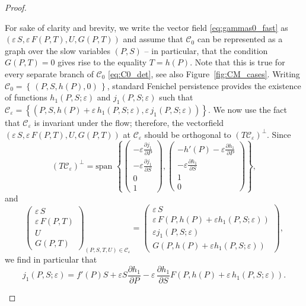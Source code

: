 \documentclass[a4paper,10pt,abstract=true,parskip=true]{scrartcl}
\theoremstyle{remark}
\numberwithin{equation}{section}
\numberwithin{thm}{section}
\newcommand{\eps}{\varepsilon}
\begin{document}
\begin{proof}
\begin{enumerate}
    For sake of clarity and brevity, we write the vector field \eqref{eq:gammas0_fast} as $(\eps\,S,\eps\,F(P,T),U,G(P,T))$ and assume that $\mathcal{C}_0$ can be represented as a graph over the slow variables $(P,S)$ -- in particular, that the condition $G(P,T) = 0$ gives rise to the equality $T = h(P)$. Note that this is true for every separate branch of $\mathcal{C}_0$ \eqref{eq:C0_det}, see also Figure~\ref{fig:CM_cases}. Writing $\mathcal{C}_0 = \left\{\,(P,S,h(P),0)\,\right\}$, standard Fenichel persistence provides the existence of functions $h_1(P,S;\eps)$ and $j_1(P,S;\eps)$ such that $\mathcal{C}_\eps = \left\{(P,S,h(P) + \eps\,h_1(P,S;\eps),\eps\,j_1(P,S;\eps))\right\}$. We now use the fact that $\mathcal{C}_\eps$ is invariant under the flow; therefore, the vectorfield $(\eps\,S,\eps\,F(P,T),U,G(P,T))$ at $\mathcal{C}_\eps$ should be orthogonal to $\left(T \mathcal{C}_\eps\right)^\perp$. Since
    \begin{displaymath}
        \left(T \mathcal{C}_\eps\right)^\perp = \text{span }\left\{\begin{pmatrix}-\eps \frac{\partial j_1}{\partial P}\\-\eps \frac{\partial j_1}{\partial S}\\0\\1\end{pmatrix},\begin{pmatrix}-h'(P)-\eps\frac{\partial h_1}{\partial P}\\-\eps\frac{\partial h_1}{\partial S}\\1\\0\end{pmatrix}\right\},
    \end{displaymath}
    and
    \begin{displaymath}
        \begin{pmatrix}\eps\,S\\\eps\,F(P,T)\\U\\G(P,T)\end{pmatrix}_{(P,S,T,U)\in\mathcal{C}_\eps} = \begin{pmatrix}\eps\,S\\\eps\,F(P,h(P)+\eps h_1(P,S;\eps))\\\eps j_1(P,S;\eps)\\G(P,h(P)+\eps h_1(P,S;\eps))\end{pmatrix},
    \end{displaymath}
    we find in particular that
    \begin{equation}
        j_1(P,S;\eps) = f'(P)S+ \eps S \frac{\partial h_1}{\partial P} - \eps\,\frac{\partial h_1}{\partial S} F(P,h(P)+\eps\,h_1(P,S;\eps)).

\end{equation}
\end{enumerate}
\end{proof}
\end{document}
